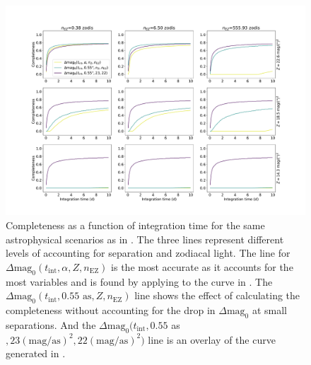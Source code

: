 \begin{figure}
  \begin{center}
    \includegraphics[width=\textwidth]{ch3/figures/Z_EZ_comps_flat.pdf}
  \end{center}
  \caption{Completeness as a function of integration time for the same astrophysical
  scenarios as in . The three lines represent different levels
  of accounting for separation and zodiacal light. The line for
  $\Delta\textrm{mag}_0(t_\textrm{int}, \alpha, Z, n_\textrm{EZ})$
  is the most accurate as it accounts for the most variables and is 
  found by applying  to the curve in .
  The 
  $\Delta\textrm{mag}_0(t_\textrm{int}, 0.55\textrm{ as}, Z, n_\textrm{EZ})$
  line shows the effect of calculating the completeness without accounting for
  the drop in $\Delta\textrm{mag}_0$ at small separations. And the
  $\Delta\mathrm{mag}_0(t_\mathrm{int}, 0.55$\textrm{ as}$, 23 (\textrm{mag}/\textrm{as})^2, 22(\textrm{mag}/\textrm{as})^2)$
  line is an overlay of the curve generated in .
  }
  \label{fig:fZ_fEZ_comps}
\end{figure}

